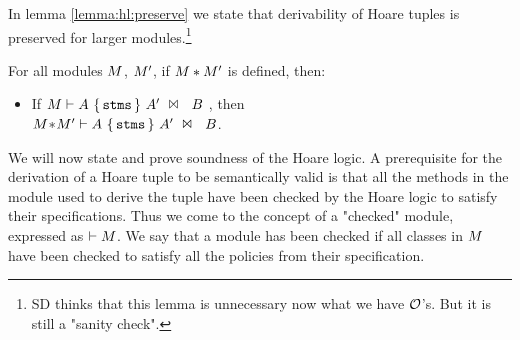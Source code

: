 In lemma \ref{lemma:hl:preserve}  we state that  derivability %
of Hoare tuples is preserved for larger modules.\footnote{SD thinks that this lemma is unnecessary now what we have $\O$'s. But it is still a "sanity check". }
\begin{lemma}
\label{lemma:hl:preserve}
For all modules $\M$, $\M'$, if $\M*\M'$ is defined, then:

\begin{itemize}
\item
If $\HoareExpl     {\A} {\prg{stms}}  {\M} {\A'} {\B}$ , then\\ $\HoareExpl     {\A} {\prg{stms}}  {\M\!*\!\M'} {\A'} {\B}$.
\end{itemize}
\end{lemma}


We will now state and prove soundness of the Hoare logic. A prerequisite for the derivation of a Hoare tuple to be semantically valid is that all the methods in the module used to derive the tuple have been checked by the Hoare logic to satisfy their specifications. Thus we come to the concept of a "checked" module, expressed as $\vdash \M$.
%
We say that a module has been checked %
if all classes in $\M$ have been checked to satisfy all the policies from their specification.

